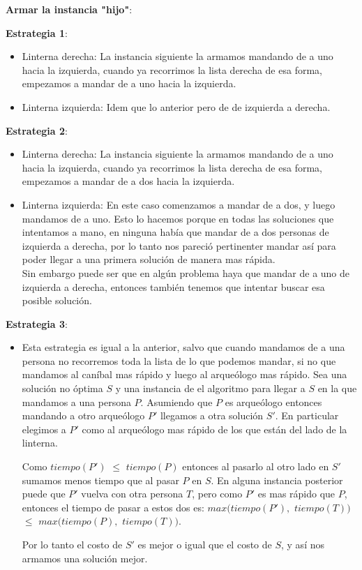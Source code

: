 \textbf{Armar la instancia "hijo"}:

\textbf{Estrategia 1}:
\begin{itemize}
\item Linterna derecha: La instancia siguiente la armamos mandando de a uno hacia la izquierda, cuando ya recorrimos la lista derecha de esa forma, empezamos a mandar de a uno hacia la izquierda.
\item Linterna izquierda: Idem que lo anterior pero de de izquierda a derecha.  

\end{itemize}

      \textbf{Estrategia 2}:
\begin{itemize}
\item Linterna derecha: La instancia siguiente la armamos mandando de a uno hacia la izquierda, cuando ya recorrimos la lista derecha de esa forma, empezamos a mandar de a dos hacia la izquierda.
\item Linterna izquierda: En este caso comenzamos a mandar de a dos, y luego mandamos de a uno. Esto lo hacemos porque en todas las soluciones que intentamos a mano, en ninguna había que mandar de a dos personas de izquierda a derecha, por lo tanto nos pareció pertinenter mandar así para poder llegar a una primera solución de manera mas rápida. \\ Sin embargo puede ser que en algún problema haya que mandar de a uno de izquierda a derecha, entonces también tenemos que intentar buscar esa posible solución.  

\end{itemize}
      \textbf{Estrategia 3}:
\begin{itemize}
\item Esta estrategia es igual a la anterior, salvo que cuando mandamos de a una persona no recorremos toda la lista de lo que podemos mandar, si no que mandamos al caníbal mas rápido y luego al arqueólogo mas rápido. 
Sea una solución no óptima $S$ y una instancia de el algoritmo para llegar a $S$ en la que mandamos a una persona $P$. Asumiendo que $P$ es arqueólogo entonces mandando a otro arqueólogo $P'$ llegamos a otra solución $S'$. En particular elegimos a $P'$ como al arqueólogo mas rápido de los que están del lado de la linterna.
 
Como $tiempo(P')$ $\leq$ $tiempo(P)$ entonces al pasarlo al otro lado en $S'$ sumamos menos tiempo que al pasar $P$ en $S$. 
En alguna instancia posterior puede que $P'$ vuelva con otra persona $T$, pero como $P'$ es mas rápido que $P$, entonces el tiempo de pasar a estos dos es: $max(tiempo(P'),$ $tiempo(T))$ $\leq$ $max(tiempo(P),$ $tiempo(T))$.

Por lo tanto el costo de $S'$ es mejor o igual que el costo de $S$, y así nos armamos una solución mejor.
\end{itemize}
